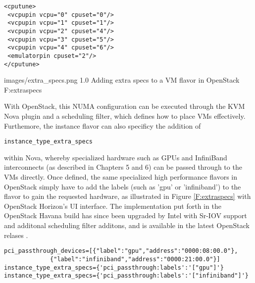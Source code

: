 \begin{verbatim}
<cputune>
 <vcpupin vcpu="0" cpuset="0"/>
 <vcpupin vcpu="1" cpuset="1"/>
 <vcpupin vcpu="2" cpuset="4"/>
 <vcpupin vcpu="3" cpuset="5"/>
 <vcpupin vcpu="4" cpuset="6"/>
 <emulatorpin cpuset="2"/>
</cputune>
\end{verbatim}

  {images/extra_specs.png}
  {1.0}
  {Adding extra specs to a VM flavor in OpenStack}
  {F:extraspecs}

With OpenStack, this NUMA configuration can be executed through the KVM Nova plugin and a scheduling filter, which defines how to place VMs effectively. Furthemore, the instance flavor can also specificy the addition of \begin{verbatim}instance_type_extra_specs\end{verbatim} within Nova, whereby specialized hardware such as GPUs and InfiniBand interconnects (as described in Chapters 5 and 6) can be passed through to the VMs directly. Once defined, the same specialized high performance flavors in OpenStack simply have to add the labels (such as 'gpu' or 'infiniband') to the flavor to gain the requested hardware, as illustrated in Figure \ref{F:extraspecs} with OpenStack Horizon's UI interface.  The implementation put forth in the OpenStack Havana build has since been upgraded by Intel with Sr-IOV support and additonal scheduling filter additons, and is available in the latest OpenStack relases \cite{jiang2015}. 

\begin{verbatim}
pci_passthrough_devices=[{"label":"gpu","address":"0000:08:00.0"},
			 {"label":"infiniband","address":"0000:21:00.0"}]
instance_type_extra_specs={'pci_passthrough:labels':'["gpu"]'}
instance_type_extra_specs={'pci_passthrough:labels':'["infiniband"]'}
\end{verbatim}
 

